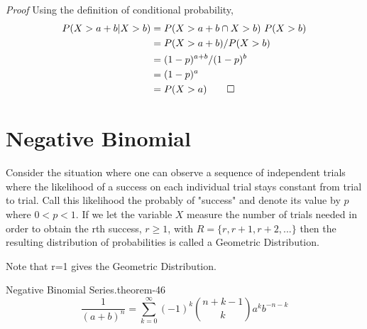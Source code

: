 \documentclass[10pt,]{book}
\makeatletter
\renewcommand*{\proofname}{Proof}
\renewenvironment{proof}[1][\proofname]{\par
  \pushQED{\qed}%
  \normalfont \topsep6\p@\@plus6\p@\relax
  \trivlist
  \item\relax
    {\itshape
    #1\@addpunct{.}}\hspace\labelsep\ignorespaces
}{%
  \popQED\endtrivlist\@endpefalse
}
\numberwithin{equation}{section}
\newcommand{\lt}{<}
\makeatother
\begin{document}
\begin{proof}\hypertarget{proof-47}{}
\hypertarget{p-895}{}%
Using the definition of conditional probability,%
\begin{align*}
P( X > a + b | X > b ) & = P( X > a + b \cap X > b ) \ P( X > b)\\
& = P( X > a + b ) / P( X > b)\\
& = (1-p)^{a+b} / (1-p)^b\\
& = (1-p)^a\\
& = P(X > a)\qedhere
\end{align*}
%
\end{proof}
%
%
%
\typeout{************************************************}
\typeout{************************************************}
%
\section[{Negative Binomial}]{Negative Binomial}\label{section-48}
\hypertarget{p-896}{}%
Consider the situation where one can observe a sequence  of independent trials where the likelihood of a success on each individual trial stays constant from trial to trial. Call this likelihood the probably of "success" and denote its value by \(p\) where \(0 \lt p \lt 1 \). If we let the variable \(X\) measure the number of trials needed in order to obtain the rth success, \(r \ge 1\), with \(R = \{r, r+1, r+2, ... \}\) then the resulting distribution of probabilities is called a Geometric Distribution.%
\par
\hypertarget{p-897}{}%
Note that r=1 gives the Geometric Distribution.%
\par
\hypertarget{p-898}{}%
\begin{theorem}{Negative Binomial Series.}{}{theorem-46}%
\hypertarget{p-899}{}%
%
\begin{equation*}
\displaystyle \frac{1}{(a+b)^n} = \sum_{k=0}^{\infty} {(-1)^k \binom{n + k - 1}{k} a^k b^{-n-k}}
\end{equation*}
%
\end{theorem}
\end{document}
